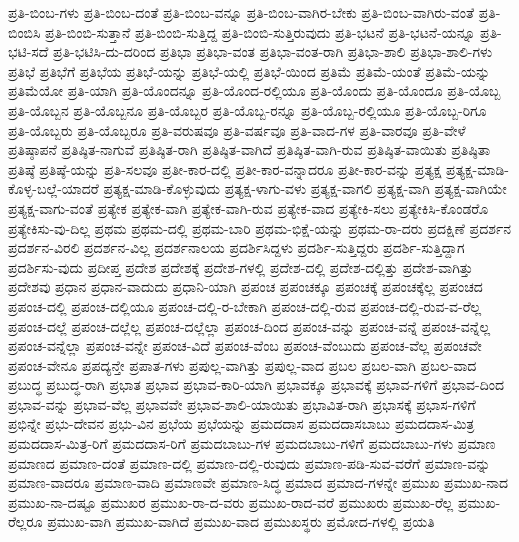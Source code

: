 {ಪ್ರತಿ-ಬಿಂಬ-ಗಳು
ಪ್ರತಿ-ಬಿಂಬ-ದಂತೆ
ಪ್ರತಿ-ಬಿಂಬ-ವನ್ನೂ
ಪ್ರತಿ-ಬಿಂಬ-ವಾಗಿರ-ಬೇಕು
ಪ್ರತಿ-ಬಿಂಬ-ವಾಗಿರು-ವಂತೆ
ಪ್ರತಿ-ಬಿಂಬಿಸಿ
ಪ್ರತಿ-ಬಿಂಬಿ-ಸುತ್ತಾನೆ
ಪ್ರತಿ-ಬಿಂಬಿ-ಸುತ್ತಿದ್ದ
ಪ್ರತಿ-ಬಿಂಬಿ-ಸುತ್ತಿರುವುದು
ಪ್ರತಿ-ಭಟನೆ
ಪ್ರತಿ-ಭಟನೆ-ಯನ್ನೂ
ಪ್ರತಿ-ಭಟಿ-ಸದೆ
ಪ್ರತಿ-ಭಟಿಸಿ-ದು-ದರಿಂದ
ಪ್ರತಿಭಾ
ಪ್ರತಿಭಾ-ವಂತ
ಪ್ರತಿಭಾ-ವಂತ-ರಾಗಿ
ಪ್ರತಿಭಾ-ಶಾಲಿ
ಪ್ರತಿಭಾ-ಶಾಲಿ-ಗಳು
ಪ್ರತಿಭೆ
ಪ್ರತಿಭೆಗೆ
ಪ್ರತಿಭೆಯ
ಪ್ರತಿಭೆ-ಯನ್ನು
ಪ್ರತಿಭೆ-ಯಲ್ಲಿ
ಪ್ರತಿಭೆ-ಯಿಂದ
ಪ್ರತಿಮೆ
ಪ್ರತಿಮೆ-ಯಂತೆ
ಪ್ರತಿಮೆ-ಯನ್ನು
ಪ್ರತಿಮೆಯೋ
ಪ್ರತಿ-ಯಾಗಿ
ಪ್ರತಿ-ಯೊಂದನ್ನೂ
ಪ್ರತಿ-ಯೊಂದ-ರಲ್ಲಿಯೂ
ಪ್ರತಿ-ಯೊಂದು
ಪ್ರತಿ-ಯೊಂದೂ
ಪ್ರತಿ-ಯೊಬ್ಬ
ಪ್ರತಿ-ಯೊಬ್ಬನ
ಪ್ರತಿ-ಯೊಬ್ಬನೂ
ಪ್ರತಿ-ಯೊಬ್ಬರ
ಪ್ರತಿ-ಯೊಬ್ಬ-ರನ್ನೂ
ಪ್ರತಿ-ಯೊಬ್ಬ-ರಲ್ಲಿಯೂ
ಪ್ರತಿ-ಯೊಬ್ಬ-ರಿಗೂ
ಪ್ರತಿ-ಯೊಬ್ಬರು
ಪ್ರತಿ-ಯೊಬ್ಬರೂ
ಪ್ರತಿ-ವರುಷವೂ
ಪ್ರತಿ-ವರ್ಷವೂ
ಪ್ರತಿ-ವಾದ-ಗಳ
ಪ್ರತಿ-ವಾರವೂ
ಪ್ರತಿ-ವೇಳೆ
ಪ್ರತಿಷ್ಠಾಪನೆ
ಪ್ರತಿಷ್ಠಿತ-ನಾಗುವೆ
ಪ್ರತಿಷ್ಠಿತ-ರಾಗಿ
ಪ್ರತಿಷ್ಠಿತ-ವಾಗಿದೆ
ಪ್ರತಿಷ್ಠಿತ-ವಾಗಿ-ರುವ
ಪ್ರತಿಷ್ಠಿತ-ವಾಯಿತು
ಪ್ರತಿಷ್ಠಿತಾ
ಪ್ರತಿಷ್ಠೆ
ಪ್ರತಿಷ್ಠೆ-ಯನ್ನು
ಪ್ರತಿ-ಸಲವೂ
ಪ್ರತೀ-ಕಾರ-ದಲ್ಲಿ
ಪ್ರತೀ-ಕಾರ-ವನ್ನಾದರೂ
ಪ್ರತೀ-ಕಾರ-ವನ್ನು
ಪ್ರತ್ಯಕ್ಷ
ಪ್ರತ್ಯಕ್ಷ-ಮಾಡಿ-ಕೊಳ್ಳ-ಬಲ್ಲೆ-ಯಾದರೆ
ಪ್ರತ್ಯಕ್ಷ-ಮಾಡಿ-ಕೊಳ್ಳುವುದು
ಪ್ರತ್ಯಕ್ಷ-ಳಾಗು-ವಳು
ಪ್ರತ್ಯಕ್ಷ-ವಾಗಲಿ
ಪ್ರತ್ಯಕ್ಷ-ವಾಗಿ
ಪ್ರತ್ಯಕ್ಷ-ವಾಗಿಯೇ
ಪ್ರತ್ಯಕ್ಷ-ವಾಗು-ವಂತೆ
ಪ್ರತ್ಯೇಕ
ಪ್ರತ್ಯೇಕ-ವಾಗಿ
ಪ್ರತ್ಯೇಕ-ವಾಗಿ-ರುವ
ಪ್ರತ್ಯೇಕ-ವಾದ
ಪ್ರತ್ಯೇಕಿ-ಸಲು
ಪ್ರತ್ಯೇಕಿಸಿ-ಕೊಂಡರೊ
ಪ್ರತ್ಯೇಕಿಸು-ವು-ದಿಲ್ಲ
ಪ್ರಥಮ
ಪ್ರಥಮ-ದಲ್ಲಿ
ಪ್ರಥಮ-ಬಾರಿ
ಪ್ರಥಮ-ಭಿಕ್ಷೆ-ಯನ್ನು
ಪ್ರಥಮ-ರಾ-ದರು
ಪ್ರದಕ್ಷಿಣೆ
ಪ್ರದರ್ಶನ
ಪ್ರದರ್ಶನ-ವಿರಲಿ
ಪ್ರದರ್ಶನ-ವಿಲ್ಲ
ಪ್ರದರ್ಶನಾಲಯ
ಪ್ರದರ್ಶಿಸಿದ್ದಳು
ಪ್ರದರ್ಶಿ-ಸುತ್ತಿದ್ದರು
ಪ್ರದರ್ಶಿ-ಸುತ್ತಿದ್ದಾಗ
ಪ್ರದರ್ಶಿಸು-ವುದು
ಪ್ರದೀಪ್ತ
ಪ್ರದೇಶ
ಪ್ರದೇಶಕ್ಕೆ
ಪ್ರದೇಶ-ಗಳಲ್ಲಿ
ಪ್ರದೇಶ-ದಲ್ಲಿ
ಪ್ರದೇಶ-ದಲ್ಲಿತ್ತು
ಪ್ರದೇಶ-ವಾಗಿತ್ತು
ಪ್ರದೇಶವು
ಪ್ರಧಾನ
ಪ್ರಧಾನ-ವಾದುದು
ಪ್ರಧಾನಿ-ಯಾಗಿ
ಪ್ರಪಂಚ
ಪ್ರಪಂಚಕ್ಕೂ
ಪ್ರಪಂಚಕ್ಕೆ
ಪ್ರಪಂಚಕ್ಕೆಲ್ಲ
ಪ್ರಪಂಚದ
ಪ್ರಪಂಚ-ದಲ್ಲಿ
ಪ್ರಪಂಚ-ದಲ್ಲಿಯೂ
ಪ್ರಪಂಚ-ದಲ್ಲಿ-ರ-ಬೇಕಾಗಿ
ಪ್ರಪಂಚ-ದಲ್ಲಿ-ರುವ
ಪ್ರಪಂಚ-ದಲ್ಲಿ-ರುವ-ವ-ರೆಲ್ಲ
ಪ್ರಪಂಚ-ದಲ್ಲೆ
ಪ್ರಪಂಚ-ದಲ್ಲೆಲ್ಲ
ಪ್ರಪಂಚ-ದಲ್ಲೆಲ್ಲಾ
ಪ್ರಪಂಚ-ದಿಂದ
ಪ್ರಪಂಚ-ವನ್ನು
ಪ್ರಪಂಚ-ವನ್ನೆ
ಪ್ರಪಂಚ-ವನ್ನೆಲ್ಲ
ಪ್ರಪಂಚ-ವನ್ನೆಲ್ಲಾ
ಪ್ರಪಂಚ-ವನ್ನೇ
ಪ್ರಪಂಚ-ವಿದೆ
ಪ್ರಪಂಚ-ವೆಂಬ
ಪ್ರಪಂಚ-ವೆಂಬುದು
ಪ್ರಪಂಚ-ವೆಲ್ಲ
ಪ್ರಪಂಚವೇ
ಪ್ರಪಂಚ-ವೇನೂ
ಪ್ರಪದ್ಯನ್ತೇ
ಪ್ರಪಾತ-ಗಳು
ಪ್ರಪುಲ್ಲ-ವಾಗಿತ್ತು
ಪ್ರಪುಲ್ಲ-ವಾದ
ಪ್ರಬಲ
ಪ್ರಬಲ-ವಾಗಿ
ಪ್ರಬಲ-ವಾದ
ಪ್ರಬುದ್ಧ
ಪ್ರಬುದ್ಧ-ರಾಗಿ
ಪ್ರಭಾತ
ಪ್ರಭಾವ
ಪ್ರಭಾವ-ಕಾರಿ-ಯಾಗಿ
ಪ್ರಭಾವಕ್ಕೂ
ಪ್ರಭಾವಕ್ಕೆ
ಪ್ರಭಾವ-ಗಳಿಗೆ
ಪ್ರಭಾವ-ದಿಂದ
ಪ್ರಭಾವ-ವನ್ನು
ಪ್ರಭಾವ-ವೆಲ್ಲ
ಪ್ರಭಾವವೇ
ಪ್ರಭಾವ-ಶಾಲಿ-ಯಾಯಿತು
ಪ್ರಭಾವಿತ-ರಾಗಿ
ಪ್ರಭಾಸಕ್ಕೆ
ಪ್ರಭಾಸ-ಗಳಿಗೆ
ಪ್ರಭಿನ್ನೇ
ಪ್ರಭು-ದೇವನ
ಪ್ರಭು-ವಿನ
ಪ್ರಭೆಯ
ಪ್ರಭೆಯನ್ನು
ಪ್ರಮದದಾಸ
ಪ್ರಮದದಾಸಬಾಬು
ಪ್ರಮದದಾಸ-ಮಿತ್ರ
ಪ್ರಮದದಾಸ-ಮಿತ್ರ-ರಿಗೆ
ಪ್ರಮದದಾಸ-ರಿಗೆ
ಪ್ರಮದಬಾಬು-ಗಳ
ಪ್ರಮದಬಾಬು-ಗಳಿಗೆ
ಪ್ರಮದಬಾಬು-ಗಳು
ಪ್ರಮಾಣ
ಪ್ರಮಾಣದ
ಪ್ರಮಾಣ-ದಂತೆ
ಪ್ರಮಾಣ-ದಲ್ಲಿ
ಪ್ರಮಾಣ-ದಲ್ಲಿ-ರುವುದು
ಪ್ರಮಾಣ-ಪಡಿ-ಸುವ-ವರೆಗೆ
ಪ್ರಮಾಣ-ವನ್ನು
ಪ್ರಮಾಣ-ವಾದರೂ
ಪ್ರಮಾಣ-ವಾದಿ
ಪ್ರಮಾಣವೇ
ಪ್ರಮಾಣ-ಸಿದ್ಧ
ಪ್ರಮಾದ
ಪ್ರಮಾದ-ಗಳನ್ನೇ
ಪ್ರಮುಖ
ಪ್ರಮುಖ-ನಾದ
ಪ್ರಮುಖ-ನಾ-ದಷ್ಟೂ
ಪ್ರಮುಖರ
ಪ್ರಮುಖ-ರಾ-ದ-ವರು
ಪ್ರಮುಖ-ರಾದ-ವರೆ
ಪ್ರಮುಖರು
ಪ್ರಮುಖ-ರೆಲ್ಲ
ಪ್ರಮುಖ-ರೆಲ್ಲರೂ
ಪ್ರಮುಖ-ವಾಗಿ
ಪ್ರಮುಖ-ವಾಗಿದೆ
ಪ್ರಮುಖ-ವಾದ
ಪ್ರಮುಖಸ್ಥರು
ಪ್ರಮೋದ-ಗಳಲ್ಲಿ
ಪ್ರಯತಿ
}
